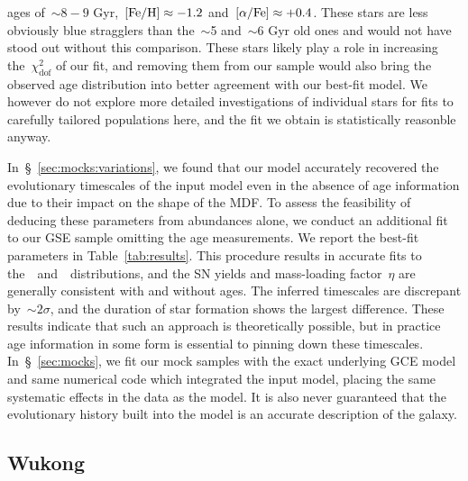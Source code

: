 \documentclass[ms.tex]{subfiles}
\begin{document}
ages of~$\sim$$8 - 9$ Gyr,~$\text{[Fe/H]} \approx -1.2$ and~$\text{[$\alpha$/Fe]} \approx +0.4$.
These stars are less obviously blue stragglers than the~$\sim$5 and~$\sim$6 Gyr
old ones and would not have stood out without this comparison.
These stars likely play a role in increasing the~$\chi_\text{dof}^2$ of our
fit, and removing them from our sample would also bring the observed age
distribution into better agreement with our best-fit model.
We however do not explore more detailed investigations of individual stars for
fits to carefully tailored populations here, and the fit we obtain is
statistically reasonble anyway.
\par
In~\S~\ref{sec:mocks:variations}, we found that our model accurately recovered
the evolutionary timescales of the input model even in the absence of age
information due to their impact on the shape of the MDF.
To assess the feasibility of deducing these parameters from abundances alone,
we conduct an additional fit to our GSE sample omitting the age measurements.
We report the best-fit parameters in Table~\ref{tab:results}.
This procedure results in accurate fits to the~\feh~and~\afe~distributions, and
the SN yields and mass-loading factor~$\eta$ are generally consistent with
and without ages.
The inferred timescales are discrepant by~$\sim$$2\sigma$, and the duration of
star formation shows the largest difference.
These results indicate that such an approach is theoretically possible, but in
practice age information in some form is essential to pinning down these
timescales.
In~\S~\ref{sec:mocks}, we fit our mock samples with the exact underlying GCE
model and same numerical code which integrated the input model, placing the
same systematic effects in the data as the model.
It is also never guaranteed that the evolutionary history built into the model
is an accurate description of the galaxy.

\subsection{Wukong}
\label{sec:h3:wukong}
\end{document}
